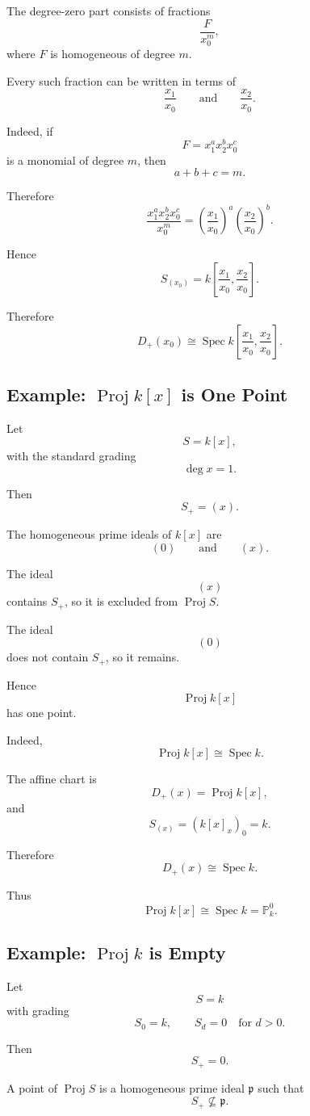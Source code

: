 \documentclass[12pt,a4paper]{article}
\DeclareMathOperator{\Spec}{Spec}
\DeclareMathOperator{\Proj}{Proj}
\newcommand{\PP}{\mathbb P}
\theoremstyle{notespace}
\begin{document}
The degree-zero part consists of fractions
\[
\frac{F}{x_0^m},
\]
where \(F\) is homogeneous of degree \(m\).

Every such fraction can be written in terms of
\[
\frac{x_1}{x_0}
\qquad\text{and}\qquad
\frac{x_2}{x_0}.
\]

Indeed, if
\[
F=x_1^a x_2^b x_0^c
\]
is a monomial of degree \(m\), then
\[
a+b+c=m.
\]

Therefore
\[
\frac{x_1^a x_2^b x_0^c}{x_0^m}
=
\left(\frac{x_1}{x_0}\right)^a
\left(\frac{x_2}{x_0}\right)^b.
\]

Hence
\[
S_{(x_0)}
=
k\left[
\frac{x_1}{x_0},
\frac{x_2}{x_0}
\right].
\]

Therefore
\[
D_+(x_0)
\cong
\Spec k\left[
\frac{x_1}{x_0},
\frac{x_2}{x_0}
\right].
\]

\subsection{Example: \texorpdfstring{$\Proj k[x]$}{Proj k[x]} is One Point}

Let
\[
S=k[x],
\]
with the standard grading
\[
\deg x=1.
\]

Then
\[
S_+=(x).
\]

The homogeneous prime ideals of \(k[x]\) are
\[
(0)
\qquad\text{and}\qquad
(x).
\]

The ideal
\[
(x)
\]
contains \(S_+\), so it is excluded from \(\Proj S\).

The ideal
\[
(0)
\]
does not contain \(S_+\), so it remains.

Hence
\[
\Proj k[x]
\]
has one point.

Indeed,
\[
\Proj k[x]\cong \Spec k.
\]

The affine chart is
\[
D_+(x)=\Proj k[x],
\]
and
\[
S_{(x)}
=
(k[x]_x)_0
=
k.
\]

Therefore
\[
D_+(x)\cong \Spec k.
\]

Thus
\[
\boxed{
	\Proj k[x]\cong \Spec k=\PP_k^0.
}
\]

\subsection{Example: \texorpdfstring{$\Proj k$}{Proj k} is Empty}

Let
\[
S=k
\]
with grading
\[
S_0=k,
\qquad
S_d=0
\quad\text{for }d>0.
\]

Then
\[
S_+=0.
\]

A point of \(\Proj S\) is a homogeneous prime ideal \(\mathfrak p\) such that
\[
S_+\not\subseteq \mathfrak p.
\]
\end{document}
